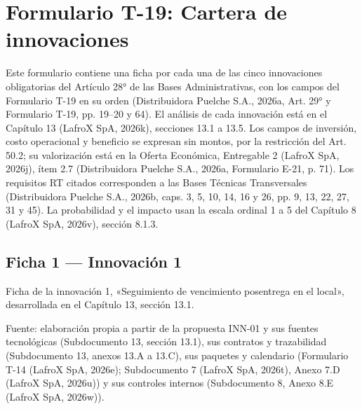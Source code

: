 
\chapter*{Formulario T-19: Cartera de innovaciones}
\label{cap:sd13-T19}

Este formulario contiene una ficha por cada una de las cinco innovaciones obligatorias del Artículo 28° de las Bases Administrativas, con los campos del Formulario T-19 en su orden (Distribuidora Puelche S.A., 2026a, Art. 29° y Formulario T-19, pp. 19–20 y 64). El análisis de cada innovación está en el Capítulo 13 (LafroX SpA, 2026k), secciones 13.1 a 13.5. Los campos de inversión, costo operacional y beneficio se expresan sin montos, por la restricción del Art. 50.2; su valorización está en la Oferta Económica, Entregable 2 (LafroX SpA, 2026j), ítem 2.7 (Distribuidora Puelche S.A., 2026a, Formulario E-21, p. 71). Los requisitos RT citados corresponden a las Bases Técnicas Transversales (Distribuidora Puelche S.A., 2026b, caps. 3, 5, 10, 14, 16 y 26, pp. 9, 13, 22, 27, 31 y 45). La probabilidad y el impacto usan la escala ordinal 1 a 5 del Capítulo 8 (LafroX SpA, 2026v), sección 8.1.3.

\section*{Ficha 1 — Innovación 1}

Ficha de la innovación 1, «Seguimiento de vencimiento posentrega en el local», desarrollada en el Capítulo 13, sección 13.1.

\noindent\parbox{\linewidth}{\RaggedRight Fuente: elaboración propia a partir de la propuesta INN-01 y sus fuentes tecnológicas (Subdocumento 13, sección 13.1), sus contratos y trazabilidad (Subdocumento 13, anexos 13.A a 13.C), sus paquetes y calendario (Formulario T-14 (LafroX SpA, 2026e); Subdocumento 7 (LafroX SpA, 2026t), Anexo 7.D (LafroX SpA, 2026u)) y sus controles internos (Subdocumento 8, Anexo 8.E (LafroX SpA, 2026w)).}

